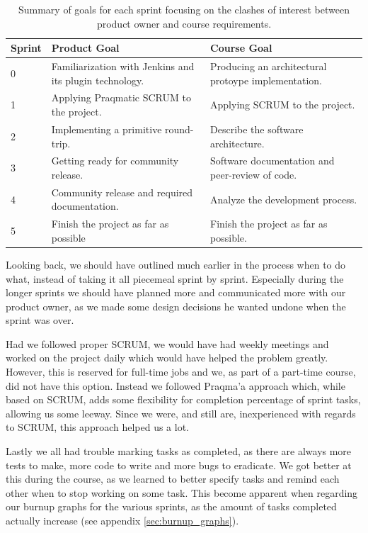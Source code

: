 \documentclass[a4paper,11pt]{article}
\begin{document}
\begin{table}
	\centering
	\begin{tabular}{| p{2cm} | p{5cm} | p{5cm} |}
		\hline
		Sprint & Product Goal & Course Goal \\
		\hline \hline
		0 & Familiarization with Jenkins and its plugin technology. & Producing
		an architectural protoype implementation. \\
		\hline
		1 & Applying Praqmatic SCRUM to the project. & Applying SCRUM to the
		project. \\
		\hline
		2 & Implementing a primitive round-trip. & Describe the software
		architecture. \\
		\hline
		3 & Getting ready for community release. & Software documentation and
		peer-review of code. \\
		\hline
		4 & Community release and required documentation. & Analyze the
		development process. \\
		\hline
		5 & Finish the project as far as possible & Finish the project as far
		as possible. \\
		\hline
	\end{tabular}
	\caption{Summary of goals for each sprint focusing on the clashes of
	interest between product owner and course requirements.}
	\label{tab:sprint_summary}
\end{table}

Looking back, we should have outlined much earlier in the process when to do
what, instead of taking it all piecemeal sprint by sprint. Especially during the
longer sprints we should have planned more and communicated more with our
product owner, as we made some design decisions he wanted undone when the
sprint was over.

Had we followed proper SCRUM, we would have had weekly meetings and worked on
the project daily which would have helped the problem greatly. However, this is
reserved for full-time jobs and we, as part of a part-time course, did not have
this option. Instead we followed Praqma'a approach which, while based on SCRUM,
adds some flexibility for completion percentage of sprint tasks, allowing us
some leeway. Since we were, and still are, inexperienced with regards to SCRUM,
this approach helped us a lot.

Lastly we all had trouble marking tasks as completed, as there are always more
tests to make, more code to write and more bugs to eradicate. We got better at
this during the course, as we learned to better specify tasks and remind each
other when to stop working on some task. This become apparent when regarding our
burnup graphs for the various sprints, as the amount of tasks completed actually
increase (see appendix \ref{sec:burnup_graphs}).
\end{document}
